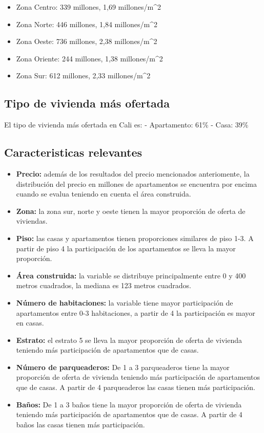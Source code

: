 \documentclass[conference,final,]{IEEEtran}
\providecommand{\tightlist}{%
  \setlength{\itemsep}{0pt}\setlength{\parskip}{0pt}}
\begin{document}
\begin{itemize}
\tightlist
\item
  Zona Centro: 339 millones, 1,69 millones/m\^{}2
\item
  Zona Norte: 446 millones, 1,84 millones/m\^{}2
\item
  Zona Oeste: 736 millones, 2,38 millones/m\^{}2
\item
  Zona Oriente: 244 millones, 1,38 millones/m\^{}2
\item
  Zona Sur: 612 millones, 2,33 millones/m\^{}2
\end{itemize}

\subsection{\textbf{Tipo de vivienda más ofertada}}

El tipo de vivienda más ofertada en Cali es: - Apartamento: 61\% - Casa:
39\%

\subsection{\textbf{Caracteristicas relevantes}}

\begin{itemize}
\tightlist
\item
  \textbf{Precio:} además de los resultados del precio mencionados
  anteriomente, la distribución del precio en millones de apartamentos
  se encuentra por encima cuando se evalua teniendo en cuenta el área
  construida.
\item
  \textbf{Zona:} la zona sur, norte y oeste tienen la mayor proporción
  de oferta de viviendas.
\item
  \textbf{Piso:} las casas y apartamentos tienen proporciones similares
  de piso 1-3. A partir de piso 4 la participación de los apartamentos
  se lleva la mayor proporción.
\item
  \textbf{Área construida:} la variable se distribuye principalmente
  entre 0 y 400 metros cuadrados, la mediana es 123 metros cuadrados.
\item
  \textbf{Número de habitaciones:} la variable tiene mayor participación
  de apartamentos entre 0-3 habitaciones, a partir de 4 la participación
  es mayor en casas.
\item
  \textbf{Estrato:} el estrato 5 se lleva la mayor proporción de oferta
  de vivienda teniendo más participación de apartamentos que de casas.
\item
  \textbf{Número de parqueaderos:} De 1 a 3 parqueaderos tiene la mayor
  proporción de oferta de vivienda teniendo más participación de
  apartamentos que de casas. A partir de 4 parqueaderos las casas tienen
  más participación.
\item
  \textbf{Baños:} De 1 a 3 baños tiene la mayor proporción de oferta de
  vivienda teniendo más participación de apartamentos que de casas. A
  partir de 4 baños las casas tienen más participación.
\end{itemize}
\end{document}
